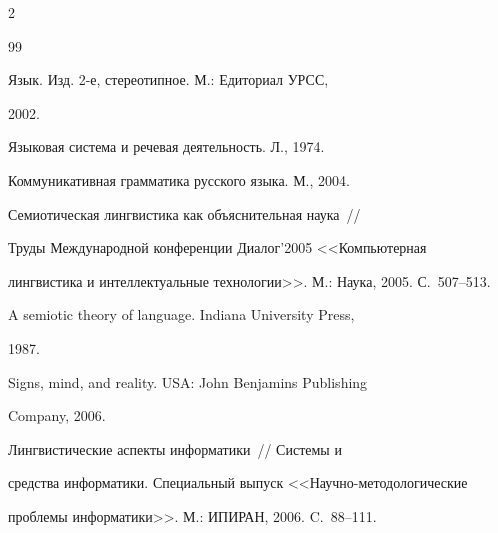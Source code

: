 \begin{multicols}{2}
{{\begin{thebibliography}{99}




Язык. Изд. 2-е, стереотипное.  М.: Едиториал УРСС,


2002.









Языковая система и речевая деятельность. Л., 1974.









Коммуникативная грамматика русского языка. М., 2004.









Семиотическая лингвистика как объяснительная наука~//


Труды Международной конференции Диалог'2005 <<Компьютерная


лингвистика и интеллектуальные технологии>>. М.: Наука, 2005. С.~507--513.









A semiotic theory of language. Indiana University Press,


1987.









Signs, mind, and reality. USA: John Benjamins Publishing


Company, 2006.









Лингвистические аспекты информатики~// Системы и


средства информатики. Специальный выпуск <<Научно-методологические


проблемы информатики>>. М.: ИПИРАН, 2006. C.~88--111.






\end{thebibliography}}}
\end{multicols}
